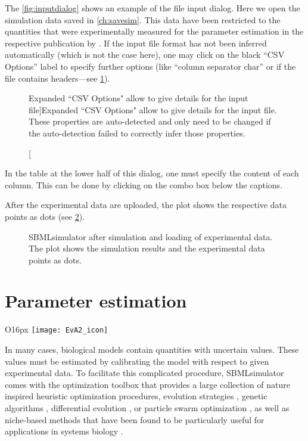 The \cref{fig:inputdialog} shows an example of the file input dialog. Here we open the simulation data saved in \cref{ch:savesim}.
This data have been restricted to the quantities that were experimentally measured for the parameter estimation in the respective publication by \citet{Bucher2011}.
If the input file format has not been inferred automatically (which is not the case here), one may click on the black ``CSV Options'' label to specify further options (like ``column separator char'' or if the file contains headers---see \cref{fig:csvoptions}).
\begin{figure}[h]
\centering
{}
\caption[Expanded ``CSV Options" allow to give details for the input file]{Expanded ``CSV Options" allow to give details for the input file.
These properties are auto-detected and only need to be changed if the auto-detection failed to correctly infer those properties.}
\label{fig:csvoptions}
\end{figure}

In the table at the lower half of this dialog, one must specify the content of each column.
This can be done by clicking on the combo box below the captions. 

After the experimental data are uploaded, the plot shows the respective data points as dots (see \cref{fig:simulationResultsWithData}).
\begin{figure}[t]
\centering
{}
\caption[SBMLsimulator after simulation and loading of experimental data]{SBMLsimulator after simulation and loading of experimental data.
The plot shows the simulation results and the experimental data points as dots.
}
\label{fig:simulationResultsWithData}
\end{figure}


\section{Parameter estimation}
\begin{wrapfigure}{O}{16px}
\vspace{\wrapfigspace}
\texttt{[image: EvA2\_icon]}
\end{wrapfigure}
In many cases, biological models contain quantities with uncertain values.
These values must be estimated by calibrating the model with respect to given experimental data.
To facilitate this complicated procedure, SBMLsimulator comes with the optimization toolbox \EvA that provides a large collection of nature inspired heuristic optimization procedures, \eg evolution strategies \citep{Rechenberg1973,
Schwefel1975}, genetic algorithms \citep{Holland1975}, differential evolution \citep{Storn96Usage}, or particle swarm optimization \citep{ClercKennedy02, Clerc2005}, as well as niche-based methods that have been found to be particularly useful for applications in systems biology \citep{Kron09NichingGCB}.

